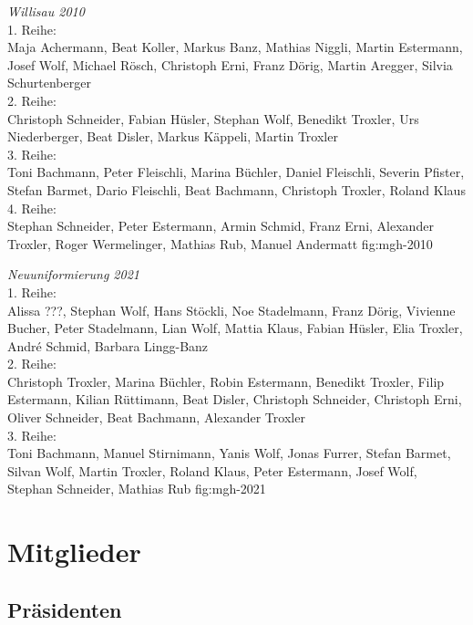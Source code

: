 \documentclass[]{book}
\begin{document}
{\emph{Willisau 2010}\\
    1. Reihe:\\
    Maja Achermann, Beat Koller, Markus Banz, Mathias Niggli, Martin Estermann,
    Josef Wolf, Michael Rösch, Christoph Erni, Franz Dörig, Martin Aregger,
    Silvia Schurtenberger\\
    2. Reihe:\\
    Christoph Schneider, Fabian Hüsler, Stephan Wolf, Benedikt Troxler, Urs
    Niederberger, Beat Disler, Markus Käppeli, Martin Troxler\\
    3. Reihe:\\
    Toni Bachmann, Peter Fleischli, Marina Büchler, Daniel Fleischli, Severin
    Pfister, Stefan Barmet, Dario Fleischli, Beat Bachmann, Christoph Troxler,
    Roland Klaus\\
    4. Reihe:\\
    Stephan Schneider, Peter Estermann, Armin Schmid, Franz Erni, Alexander
    Troxler, Roger Wermelinger, Mathias Rub, Manuel Andermatt
} {fig:mgh-2010}


{\emph{Neuuniformierung 2021}\\
    1. Reihe:\\
    Alissa ???, Stephan Wolf, Hans Stöckli, Noe Stadelmann, Franz Dörig,
    Vivienne Bucher, Peter Stadelmann, Lian Wolf, Mattia Klaus, Fabian Hüsler,
    Elia Troxler, André Schmid, Barbara Lingg-Banz\\
    2. Reihe:\\
    Christoph Troxler, Marina Büchler, Robin Estermann, Benedikt Troxler, Filip
    Estermann, Kilian Rüttimann, Beat Disler, Christoph Schneider, Christoph
    Erni, Oliver Schneider, Beat Bachmann, Alexander Troxler\\
    3. Reihe:\\
    Toni Bachmann, Manuel Stirnimann, Yanis Wolf, Jonas Furrer, Stefan Barmet,
    Silvan Wolf, Martin Troxler, Roland Klaus, Peter Estermann, Josef Wolf, Stephan
    Schneider, Mathias Rub
} {fig:mgh-2021}


\part{Mitglieder}

\chapter{Präsidenten}

\end{document}

